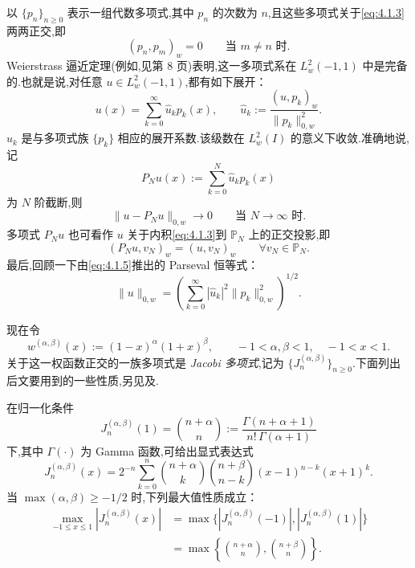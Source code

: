 以 \(\{p_n\}_{n\ge0}\) 表示一组代数多项式,其中 \(p_n\) 的次数为 \(n\),且这些多项式关于\eqref{eq:4.1.3}两两正交,即
\begin{equation}\label{eq:4.1.4}
  (p_n,p_m)_w=0\qquad \text{当 }m\ne n\text{ 时.}
\end{equation}
Weierstrass 逼近定理(例如,见第 8 页)表明,这一多项式系在 \(L_w^2(-1,1)\) 中是完备的.也就是说,对任意 \(u\in L_w^2(-1,1)\),都有如下展开：
\begin{equation}\label{eq:4.1.5}
  u(x)=\sum_{k=0}^\infty\widehat u_kp_k(x),\qquad
  \widehat u_k:=\frac{(u,p_k)_w}{\|p_k\|_{0,w}^2}.
\end{equation}
\(\widehat u_k\) 是与多项式族 \(\{p_k\}\) 相应的展开系数.该级数在 \(L_w^2(I)\) 的意义下收敛.准确地说,记
\begin{equation}\label{eq:4.1.6}
  P_Nu(x):=\sum_{k=0}^N\widehat u_kp_k(x)
\end{equation}
为 \(N\) 阶截断,则
\begin{equation}\label{eq:4.1.7}
  \|u-P_Nu\|_{0,w}\longrightarrow0\qquad\text{当 }N\to\infty\text{ 时.}
\end{equation}
多项式 \(P_Nu\) 也可看作 \(u\) 关于内积\eqref{eq:4.1.3}到 \(\mathbb P_N\) 上的正交投影,即
\begin{equation}\label{eq:4.1.8}
  (P_Nu,v_N)_w=(u,v_N)_w\qquad\forall v_N\in\mathbb P_N.
\end{equation}
最后,回顾一下由\eqref{eq:4.1.5}推出的 Parseval 恒等式：
\begin{equation}\label{eq:4.1.9}
  \|u\|_{0,w}
  =\left(\sum_{k=0}^\infty|\widehat u_k|^2\|p_k\|_{0,w}^2\right)^{1/2}.
\end{equation}

现在令
\begin{equation}\label{eq:4.1.10}
  w^{(\alpha,\beta)}(x):=(1-x)^\alpha(1+x)^\beta,
  \qquad -1<\alpha,\beta<1,\quad -1<x<1.
\end{equation}
关于这一权函数正交的一族多项式是 \emph{Jacobi 多项式},记为 \(\{J_n^{(\alpha,\beta)}\}_{n\ge0}\).下面列出后文要用到的一些性质,另见及.

在归一化条件
\[
  J_n^{(\alpha,\beta)}(1)=\binom{n+\alpha}{n}
  :=\frac{\Gamma(n+\alpha+1)}{n!\,\Gamma(\alpha+1)}
\]
下,其中 \(\Gamma(\cdot)\) 为 Gamma 函数,可给出显式表达式
\begin{equation}\label{eq:4.1.11}
  J_n^{(\alpha,\beta)}(x)=2^{-n}\sum_{k=0}^n
  \binom{n+\alpha}{k}\binom{n+\beta}{n-k}(x-1)^{n-k}(x+1)^k.
\end{equation}
当 \(\max(\alpha,\beta)\ge-1/2\) 时,下列最大值性质成立：
\begin{equation}\label{eq:4.1.12}
  \begin{aligned}
    \max_{-1\le x\le1}|J_n^{(\alpha,\beta)}(x)|
    &=\max\bigl\{|J_n^{(\alpha,\beta)}(-1)|,|J_n^{(\alpha,\beta)}(1)|\bigr\}\\
    &=\max\left\{\binom{n+\alpha}{n},\binom{n+\beta}{n}\right\}.
  \end{aligned}
\end{equation}

